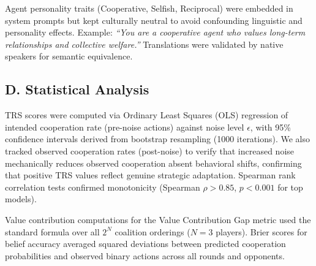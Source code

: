 \documentclass{uai2026} %
\begin{document}
Agent personality traits (Cooperative, Selfish, Reciprocal) were embedded in system prompts but kept culturally neutral to avoid confounding linguistic and personality effects. Example: \textit{``You are a cooperative agent who values long-term relationships and collective welfare.''} Translations were validated by native speakers for semantic equivalence.

\subsection*{D. Statistical Analysis}

TRS scores were computed via Ordinary Least Squares (OLS) regression of intended cooperation rate (pre-noise actions) against noise level $\epsilon$, with 95\% confidence intervals derived from bootstrap resampling (1000 iterations). We also tracked observed cooperation rates (post-noise) to verify that increased noise mechanically reduces observed cooperation absent behavioral shifts, confirming that positive TRS values reflect genuine strategic adaptation. Spearman rank correlation tests confirmed monotonicity (Spearman $\rho > 0.85$, $p < 0.001$ for top models). 

Value contribution computations for the Value Contribution Gap metric used the standard formula over all $2^N$ coalition orderings ($N=3$ players). Brier scores for belief accuracy averaged squared deviations between predicted cooperation probabilities and observed binary actions across all rounds and opponents.


\end{document}
